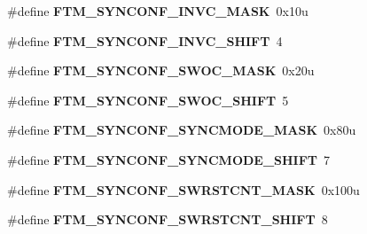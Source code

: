 \begin{DoxyCompactItemize}
\item 
\#define {\bfseries F\+T\+M\+\_\+\+S\+Y\+N\+C\+O\+N\+F\+\_\+\+I\+N\+V\+C\+\_\+\+M\+A\+SK}~0x10u\hypertarget{group__FTM__Register__Masks_ga64738e805ee6dc280986acc586530f28}{}\label{group__FTM__Register__Masks_ga64738e805ee6dc280986acc586530f28}

\item 
\#define {\bfseries F\+T\+M\+\_\+\+S\+Y\+N\+C\+O\+N\+F\+\_\+\+I\+N\+V\+C\+\_\+\+S\+H\+I\+FT}~4\hypertarget{group__FTM__Register__Masks_ga3cd40ba39f488383a2fb0f456182fd69}{}\label{group__FTM__Register__Masks_ga3cd40ba39f488383a2fb0f456182fd69}

\item 
\#define {\bfseries F\+T\+M\+\_\+\+S\+Y\+N\+C\+O\+N\+F\+\_\+\+S\+W\+O\+C\+\_\+\+M\+A\+SK}~0x20u\hypertarget{group__FTM__Register__Masks_ga4be17e62a2b566e56f1fb8e1b6277637}{}\label{group__FTM__Register__Masks_ga4be17e62a2b566e56f1fb8e1b6277637}

\item 
\#define {\bfseries F\+T\+M\+\_\+\+S\+Y\+N\+C\+O\+N\+F\+\_\+\+S\+W\+O\+C\+\_\+\+S\+H\+I\+FT}~5\hypertarget{group__FTM__Register__Masks_ga526c746783f0693a0a3ceb20e439ca26}{}\label{group__FTM__Register__Masks_ga526c746783f0693a0a3ceb20e439ca26}

\item 
\#define {\bfseries F\+T\+M\+\_\+\+S\+Y\+N\+C\+O\+N\+F\+\_\+\+S\+Y\+N\+C\+M\+O\+D\+E\+\_\+\+M\+A\+SK}~0x80u\hypertarget{group__FTM__Register__Masks_ga89a0f9556ea7950d3e283bebb64ab41a}{}\label{group__FTM__Register__Masks_ga89a0f9556ea7950d3e283bebb64ab41a}

\item 
\#define {\bfseries F\+T\+M\+\_\+\+S\+Y\+N\+C\+O\+N\+F\+\_\+\+S\+Y\+N\+C\+M\+O\+D\+E\+\_\+\+S\+H\+I\+FT}~7\hypertarget{group__FTM__Register__Masks_gaa8a4896f4e71a168309874a5523cadfc}{}\label{group__FTM__Register__Masks_gaa8a4896f4e71a168309874a5523cadfc}

\item 
\#define {\bfseries F\+T\+M\+\_\+\+S\+Y\+N\+C\+O\+N\+F\+\_\+\+S\+W\+R\+S\+T\+C\+N\+T\+\_\+\+M\+A\+SK}~0x100u\hypertarget{group__FTM__Register__Masks_gaca64a162094a826217a4e11ddc06a818}{}\label{group__FTM__Register__Masks_gaca64a162094a826217a4e11ddc06a818}

\item 
\#define {\bfseries F\+T\+M\+\_\+\+S\+Y\+N\+C\+O\+N\+F\+\_\+\+S\+W\+R\+S\+T\+C\+N\+T\+\_\+\+S\+H\+I\+FT}~8\hypertarget{group__FTM__Register__Masks_gab661d595985aee2b904c0aeae79125c0}{}\label{group__FTM__Register__Masks_gab661d595985aee2b904c0aeae79125c0}


\end{DoxyCompactItemize}
